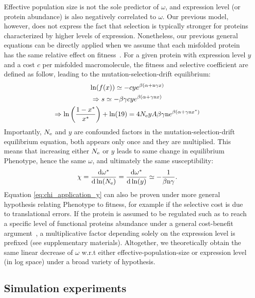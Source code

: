 Effective population size is not the sole predictor of $\omega$, and expression level (or protein abundance) is also negatively correlated to $\omega$. 
Our previous model, however, does not express the fact that selection is typically stronger for proteins characterized by higher levels of expression.
Nonetheless, our previous general equations can be directly applied when we assume that each misfolded protein has the same relative effect on fitness~\citep{Drummond2005a, Wilke2006, Drummond2008, Serohijos2012}.
For a given protein with expression level $y$ and a cost $c$ per misfolded macromolecule, the fitness and selective coefficient are defined as follow, leading to the mutation-selection-drift equilibrium:
\begin{gather}
\ln (f(x)) \simeq - c y e^{\beta (\alpha + \text{n} \gamma x)} \\
\Rightarrow s \simeq - \beta \gamma c y e^{\beta(\alpha + \gamma \text{n} x)} \\
\Rightarrow \ln \left( \frac{1 - x^{*}}{x^{*}} \right) + \ln (19) = 4N_{\mathrm{e}} y A \beta \gamma \text{n} e^{\beta(\alpha + \gamma \text{n} x^{*})}
\end{gather}
Importantly, $N_{\mathrm{e}}$ and $y$ are confounded factors in the mutation-selection-drift equilibrium equation, both appears only once and they are multiplied.
This means that increasing either $N_{\mathrm{e}}$ or $y$ leads to same change in equilibrium \gls{Phenotype}, hence the same $\omega$, and ultimately the same susceptibility:
\begin{align}
\chi = \frac{ \der \omega\eq}{\der \ln (\Ne)} = \frac{ \der \omega\eq}{\der \ln (y)} \simeq - \frac{1}{\beta \Nsite \gamma}. \label{eq:chi_application_y}
\end{align}
Equation \ref{eq:chi_application_y} can also be proven under more general hypothesis relating \gls{Phenotype} to fitness, for example if the selective cost is due to translational errors.
If the protein is assumed to be regulated such as to reach a specific level of functional proteins abundance under a general cost-benefit argument~\citep{Cherry2010,Gout2010}, a multiplicative factor depending solely on the expression level is prefixed (see supplementary materials).
Altogether, we theoretically obtain the same linear decrease of $\omega$ w.r.t either \gls{effective-population-size} or expression level (in log space) under a broad variety of hypothesis.

\subsection{Simulation experiments}

